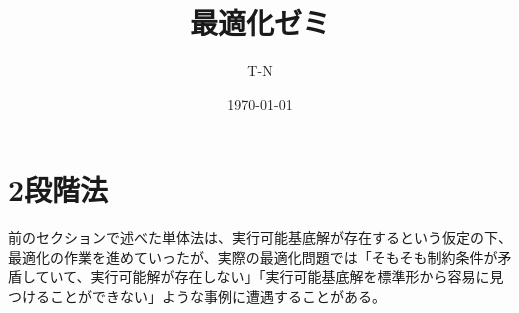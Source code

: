 \documentclass[platex,dvipdfmx]{jlreq}			%
\title{最適化ゼミ}
\author{T-N}
\date{\today}
\begin{document}
\maketitle
\section{2段階法}

前のセクションで述べた単体法は、実行可能基底解が存在するという仮定の下、最適化の作業を進めていったが、実際の最適化問題では「そもそも制約条件が矛盾していて、実行可能解が存在しない」「実行可能基底解を標準形から容易に見つけることができない」ような事例に遭遇することがある。
\end{document}
